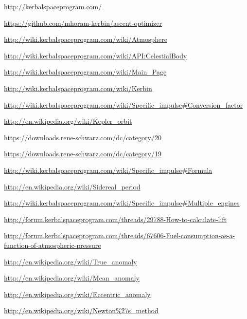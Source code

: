 \documentclass[11pt]{article}
\begin{document}
\begin{thebibliography}{Kerbin}

  \url{http://kerbalspaceprogram.com/}

  \url{https://github.com/mhoram-kerbin/ascent-optimizer}

  \url{http://wiki.kerbalspaceprogram.com/wiki/Atmosphere}

  \url{http://wiki.kerbalspaceprogram.com/wiki/API:CelestialBody}

  \url{http://wiki.kerbalspaceprogram.com/wiki/Main_Page}

  \url{http://wiki.kerbalspaceprogram.com/wiki/Kerbin}

  \url{http://wiki.kerbalspaceprogram.com/wiki/Specific_impulse#Conversion_factor}

  \url{http://en.wikipedia.org/wiki/Kepler_orbit}

  \url{https://downloads.rene-schwarz.com/dc/category/20}

  \url{https://downloads.rene-schwarz.com/dc/category/19}

  \url{http://wiki.kerbalspaceprogram.com/wiki/Specific_impulse#Formula}

  \url{http://en.wikipedia.org/wiki/Sidereal_period}

  \url{http://wiki.kerbalspaceprogram.com/wiki/Specific_impulse#Multiple_engines}

  \url{http://forum.kerbalspaceprogram.com/threads/29788-How-to-calculate-lift}

  \url{http://forum.kerbalspaceprogram.com/threads/67606-Fuel-consumption-as-a-function-of-atmospheric-pressure}

  \url{http://en.wikipedia.org/wiki/True_anomaly}

  \url{http://en.wikipedia.org/wiki/Mean_anomaly}

  \url{http://en.wikipedia.org/wiki/Eccentric_anomaly}

  \url{http://en.wikipedia.org/wiki/Newton\%27s_method}

\end{thebibliography}
\end{document}
